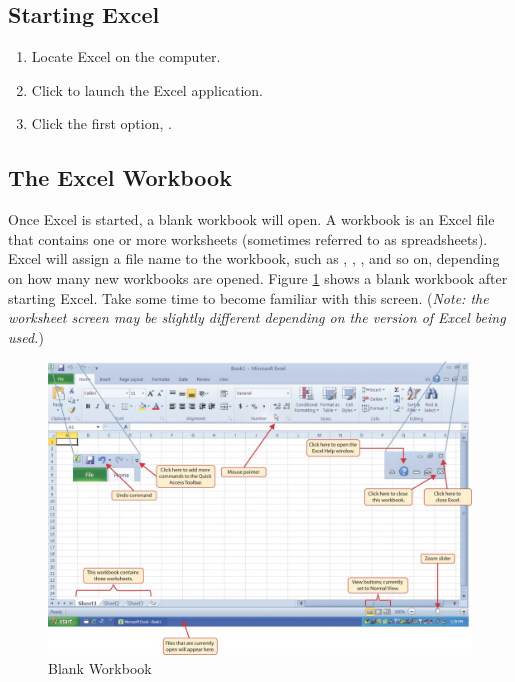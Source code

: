\subsection{Starting Excel}

\begin{enumerate}
	\item Locate Excel on the computer.
	\item Click  to launch the Excel application.
	\item Click the first option, .
\end{enumerate}

\subsection{The Excel Workbook}

Once Excel is started, a blank workbook will open. A workbook is an Excel file that contains one or more worksheets (sometimes referred to as spreadsheets). Excel will assign a file name to the workbook, such as , , , and so on, depending on how many new workbooks are opened. Figure \ref{01:fig02} shows a blank workbook after starting Excel. Take some time to become familiar with this screen. (\textit{Note: the worksheet screen may be slightly different depending on the version of Excel being used.})

\begin{figure}[H]
	\centering
	\includegraphics[width=\maxwidth{.95\linewidth}]{gfx/ch01_fig02}
	\caption{Blank Workbook}
	\label{01:fig02}
\end{figure}

